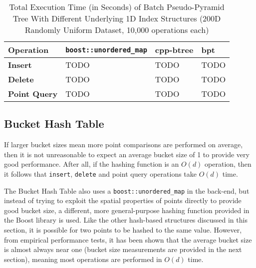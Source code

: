 \begin{table}
	\centering
	\begin{tabular}{|l|l|l|l|}
		\hline
		\textbf{Operation} & \texttt{boost::unordered\_map} & cpp-btree & bpt \\
		\hline
		\textbf{Insert} & TODO & TODO & TODO \\
		\textbf{Delete} & TODO & TODO & TODO \\
		\textbf{Point Query} & TODO & TODO & TODO \\
		\hline
	\end{tabular}
	\caption{Total Execution Time (in Seconds) of Batch Pseudo-Pyramid Tree With Different Underlying 1D Index Structures (200D Randomly Uniform Dataset, 10,000 operations each)}
	\label{tab:hashtable-bplus-time-comparison}
\end{table}

\subsection{Bucket Hash Table}


If larger bucket sizes mean more point comparisons are performed on average, then it is not unreasonable to expect an average bucket size of 1 to provide very good performance. After all, if the hashing function is an $O(d)$ operation, then it follows that \texttt{insert}, \texttt{delete} and point query operations take $O(d)$ time. 

The Bucket Hash Table also uses a \texttt{boost::unordered\_map} in the back-end, but instead of trying to exploit the spatial properties of points directly to provide good bucket size, a different, more general-purpose hashing function provided in the Boost library is used. Like the other hash-based structures discussed in this section, it is possible for two points to be hashed to the same value. However, from empirical performance tests, it has been shown that the average bucket size is almost always near one (bucket size measurements are provided in the next section), meaning most operations are performed in $O(d)$ time.

